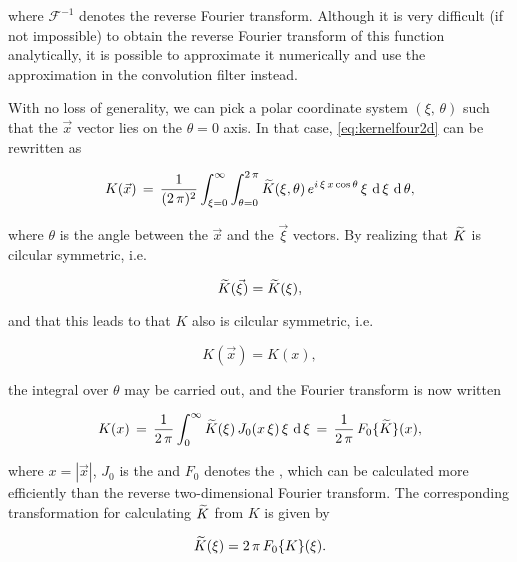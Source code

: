 where $\mathcal{F}^{-1}$ denotes the reverse Fourier transform. Although it is very difficult (if not impossible) to obtain the reverse Fourier transform of this function analytically, it is possible to approximate it numerically and use the approximation in the convolution filter instead.

With no loss of generality, we can pick a polar coordinate system $(\xi,\,\theta)$ such that the $\vec{x}$ vector lies on the $\theta = 0$ axis. In that case, \eqref{eq:kernelfour2d} can be rewritten as

\begin{equation}
K(\vec{x})\, = \,\frac{1}{(2\,\pi)^2}\int_{\xi=0}^\infty\int_{\theta=0}^{2\,\pi}\widetilde{K}(\xi, \theta)\,e^{i\,\xi\,x\cos\theta}\,\xi\,\operatorname{d}\xi\,\operatorname{d}\theta,
\end{equation}

where $\theta$ is the angle between the $\vec{x}$ and the $\vec{\xi}$ vectors. By realizing that $\widetilde{K}$ is cilcular symmetric, i.e.

\begin{equation}
\widetilde{K}(\vec{\xi}) = \widetilde{K}(\xi),
\end{equation}

and that this leads to that $K$ also is cilcular symmetric, i.e.

\begin{equation}
K(\vec{x}) = K(x),
\end{equation}

the integral over $\theta$ may be carried out, and the Fourier transform is now written

\begin{equation} \label{eq:fdkerneltokernel}
K(x)\, = \,\frac{1}{2\,\pi}\int_0^\infty\widetilde{K}(\xi)\,J_0(x\,\xi)\,\xi\,\operatorname{d}\xi\, = \,\frac{1}{2\,\pi}\,F_0\{\widetilde{K}\}(x),
\end{equation}

where $x = |\vec{x}|$, $J_0$ is the  and $F_0$ denotes the , which can be calculated more efficiently than the reverse two-dimensional Fourier transform. The corresponding transformation for calculating $\widetilde{K}$ from $K$ is given by

\begin{equation} \label{eq:kerneltofdkernel}
\widetilde{K}(\xi) = 2\,\pi\,F_0\{K\}(\xi).
\end{equation}

